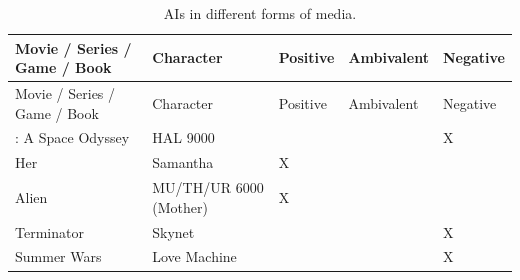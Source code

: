 \documentclass[
  letterpaper,
  DIV=11,
  numbers=noendperiod]{scrartcl}
\begin{document}
\begin{longtable}[]{@{}
  >{\raggedright\arraybackslash}p{}
  >{\raggedright\arraybackslash}p{}
  >{\raggedright\arraybackslash}p{}
  >{\raggedright\arraybackslash}p{}
  >{\raggedright\arraybackslash}p{}@{}}
\caption{AIs in different forms of media.}\tabularnewline
\toprule\noalign{}
\begin{minipage}[b]{\linewidth}\raggedright
Movie / Series / Game / Book
\end{minipage} & \begin{minipage}[b]{\linewidth}\raggedright
Character
\end{minipage} & \begin{minipage}[b]{\linewidth}\raggedright
Positive
\end{minipage} & \begin{minipage}[b]{\linewidth}\raggedright
Ambivalent
\end{minipage} & \begin{minipage}[b]{\linewidth}\raggedright
Negative
\end{minipage} \\
\midrule\noalign{}
\endfirsthead
\toprule\noalign{}
\begin{minipage}[b]{\linewidth}\raggedright
Movie / Series / Game / Book
\end{minipage} & \begin{minipage}[b]{\linewidth}\raggedright
Character
\end{minipage} & \begin{minipage}[b]{\linewidth}\raggedright
Positive
\end{minipage} & \begin{minipage}[b]{\linewidth}\raggedright
Ambivalent
\end{minipage} & \begin{minipage}[b]{\linewidth}\raggedright
Negative
\end{minipage} \\
\midrule\noalign{}
\endhead
\bottomrule\noalign{}
\endlastfoot
2001: A Space Odyssey & HAL 9000 & & & X \\
Her & Samantha & X & & \\
Alien & MU/TH/UR 6000 (Mother) & X & & \\
Terminator & Skynet & & & X \\
Summer Wars & Love Machine & & & X \\

\end{longtable}
\end{document}
